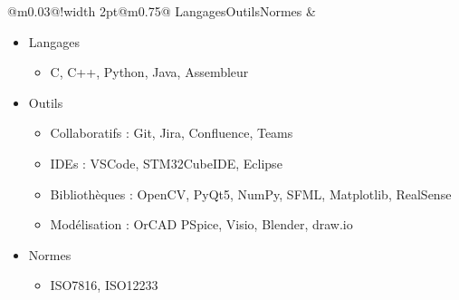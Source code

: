 \documentclass{article}
\begin{document}
\begin{tabular}{@{}m{}@{\hspace{0.07\textwidth}}!{\color{deepPurple}\vline width 2pt}@{\hspace{0.025\textwidth}}m{0.75\textwidth}@{}}
    \textcolor{gray!80}{Langages\newline Outils\newline Normes} & 
    \begin{itemize}[label={}, leftmargin=2em, topsep=0pt, partopsep=0pt, itemsep=0pt, parsep=0pt] 
        \setlength{\itemsep}{0pt} %

        \item \textcolor{gray!150}{Langages}
        \begin{itemize}[label={\textcolor{gray!80}{}}, leftmargin=2em, topsep=0pt, partopsep=0pt, itemsep=0pt, parsep=0pt] 
            \item \textcolor{gray!80}{C, C++, Python, Java, Assembleur}
        \end{itemize}

        \item \textcolor{gray!150}{Outils}
        \begin{itemize}[label={\textcolor{gray!80}{--}}, leftmargin=2em, topsep=0pt, partopsep=0pt, itemsep=0pt, parsep=0pt] %
            \item \textcolor{gray!80}{Collaboratifs : Git, Jira, Confluence, Teams}
            \item \textcolor{gray!80}{IDEs : VSCode, STM32CubeIDE, Eclipse}
            \item \textcolor{gray!80}{Bibliothèques : OpenCV, PyQt5, NumPy, SFML, Matplotlib, RealSense}
            \item \textcolor{gray!80}{Modélisation : OrCAD PSpice, Visio, Blender, draw.io}
        \end{itemize}

        \item \textcolor{gray!150}{Normes}
        \begin{itemize}[label={\textcolor{gray!80}{}}, leftmargin=2em, topsep=0pt, partopsep=0pt, itemsep=0pt, parsep=0pt] 
            \item \textcolor{gray!80}{ISO7816, ISO12233}
        \end{itemize}
    \end{itemize}
\end{tabular}


\end{document}
